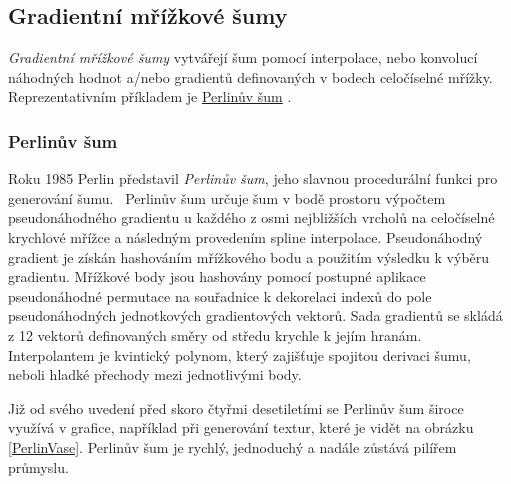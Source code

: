 \subsection{Gradientní mřížkové šumy}
\label{LatticeNoises}
\textit{Gradientní mřížkové šumy} vytvářejí šum pomocí interpolace, nebo konvolucí náhodných hodnot a/nebo gradientů definovaných v bodech celočíselné mřížky. Reprezentativním příkladem je \hyperref[perlinNoise]{Perlinův šum} \cite{Lagae10}.

\subsubsection{Perlinův šum}
\label{perlinNoise}
Roku 1985 Perlin představil \textit{Perlinův šum}, jeho slavnou procedurální funkci pro generování šumu.~\cite{PerlinKen, Perlin2002ImprovingN} Perlinův šum určuje šum v bodě prostoru výpočtem pseudonáhodného gradientu u každého z osmi nejbližších vrcholů na celočíselné krychlové mřížce a následným provedením spline interpolace. Pseudonáhodný gradient je získán hashováním mřížkového bodu a použitím výsledku k výběru gradientu. Mřížkové body jsou hashovány pomocí postupné aplikace pseudonáhodné permutace na souřadnice k dekorelaci indexů do pole pseudonáhodných jednotkových gradientových vektorů. Sada gradientů se skládá z 12 vektorů definovaných směry od středu krychle k jejím hranám. Interpolantem je kvintický polynom, který zajišťuje spojitou derivaci šumu, neboli hladké přechody mezi jednotlivými body.

Již od svého uvedení před skoro čtyřmi desetiletími se Perlinův šum široce využívá v grafice, například při generování textur, které je vidět na obrázku \ref{PerlinVase}. Perlinův šum je rychlý, jednoduchý a nadále zůstává pilířem průmyslu.

